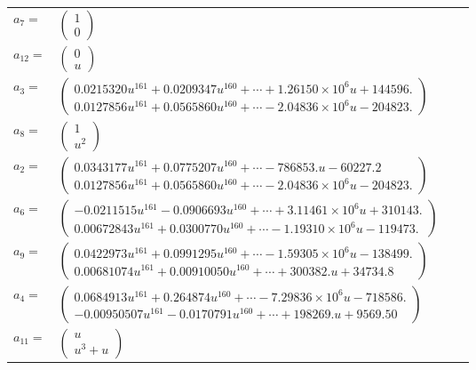 \documentclass[1p]{elsarticle_modified}
\theoremstyle{definition}
\begin{document}
\begin{tabular}{m{7pt} m{180pt} m{7pt} m{180pt} }
\flushright $a_{7}=$&$\begin{pmatrix}1\\0\end{pmatrix}$ \\
\flushright $a_{12}=$&$\begin{pmatrix}0\\u\end{pmatrix}$ \\
\flushright $a_{3}=$&$\begin{pmatrix}0.0215320 u^{161}+0.0209347 u^{160}+\cdots+1.26150\times10^{6} u+144596.\\0.0127856 u^{161}+0.0565860 u^{160}+\cdots-2.04836\times10^{6} u-204823.\end{pmatrix}$ \\
\flushright $a_{8}=$&$\begin{pmatrix}1\\u^2\end{pmatrix}$ \\
\flushright $a_{2}=$&$\begin{pmatrix}0.0343177 u^{161}+0.0775207 u^{160}+\cdots-786853. u-60227.2\\0.0127856 u^{161}+0.0565860 u^{160}+\cdots-2.04836\times10^{6} u-204823.\end{pmatrix}$ \\
\flushright $a_{6}=$&$\begin{pmatrix}-0.0211515 u^{161}-0.0906693 u^{160}+\cdots+3.11461\times10^{6} u+310143.\\0.00672843 u^{161}+0.0300770 u^{160}+\cdots-1.19310\times10^{6} u-119473.\end{pmatrix}$ \\
\flushright $a_{9}=$&$\begin{pmatrix}0.0422973 u^{161}+0.0991295 u^{160}+\cdots-1.59305\times10^{6} u-138499.\\0.00681074 u^{161}+0.00910050 u^{160}+\cdots+300382. u+34734.8\end{pmatrix}$ \\
\flushright $a_{4}=$&$\begin{pmatrix}0.0684913 u^{161}+0.264874 u^{160}+\cdots-7.29836\times10^{6} u-718586.\\-0.00950507 u^{161}-0.0170791 u^{160}+\cdots+198269. u+9569.50\end{pmatrix}$ \\
\flushright $a_{11}=$&$\begin{pmatrix}u\\u^3+u\end{pmatrix}$ \\

\end{tabular}
\end{document}
